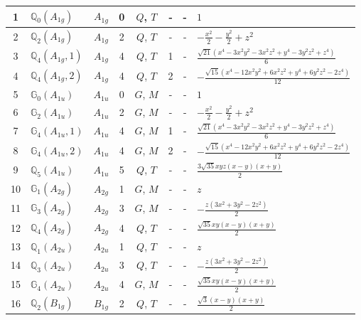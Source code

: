 \documentclass[fleqn,10pt,landscape]{jsarticle}
\begin{document}
\begin{longtable}[l]{clcccccl}
1 & $\mathbb{Q}_{0}(A_{1g})$ & $A_{1g}$ & 0 & $Q$, $T$ & - & - & $1$ \\ \hline
2 & $\mathbb{Q}_{2}(A_{1g})$ & $A_{1g}$ & 2 & $Q$, $T$ & - & - & $- \frac{x^{2}}{2} - \frac{y^{2}}{2} + z^{2}$ \\ \hline
3 & $\mathbb{Q}_{4}(A_{1g},1)$ & $A_{1g}$ & 4 & $Q$, $T$ & 1 & - & $\frac{\sqrt{21} \left(x^{4} - 3 x^{2} y^{2} - 3 x^{2} z^{2} + y^{4} - 3 y^{2} z^{2} + z^{4}\right)}{6}$ \\ \hline
4 & $\mathbb{Q}_{4}(A_{1g},2)$ & $A_{1g}$ & 4 & $Q$, $T$ & 2 & - & $- \frac{\sqrt{15} \left(x^{4} - 12 x^{2} y^{2} + 6 x^{2} z^{2} + y^{4} + 6 y^{2} z^{2} - 2 z^{4}\right)}{12}$ \\ \hline
5 & $\mathbb{G}_{0}(A_{1u})$ & $A_{1u}$ & 0 & $G$, $M$ & - & - & $1$ \\ \hline
6 & $\mathbb{G}_{2}(A_{1u})$ & $A_{1u}$ & 2 & $G$, $M$ & - & - & $- \frac{x^{2}}{2} - \frac{y^{2}}{2} + z^{2}$ \\ \hline
7 & $\mathbb{G}_{4}(A_{1u},1)$ & $A_{1u}$ & 4 & $G$, $M$ & 1 & - & $\frac{\sqrt{21} \left(x^{4} - 3 x^{2} y^{2} - 3 x^{2} z^{2} + y^{4} - 3 y^{2} z^{2} + z^{4}\right)}{6}$ \\ \hline
8 & $\mathbb{G}_{4}(A_{1u},2)$ & $A_{1u}$ & 4 & $G$, $M$ & 2 & - & $- \frac{\sqrt{15} \left(x^{4} - 12 x^{2} y^{2} + 6 x^{2} z^{2} + y^{4} + 6 y^{2} z^{2} - 2 z^{4}\right)}{12}$ \\ \hline
9 & $\mathbb{Q}_{5}(A_{1u})$ & $A_{1u}$ & 5 & $Q$, $T$ & - & - & $\frac{3 \sqrt{35} x y z \left(x - y\right) \left(x + y\right)}{2}$ \\ \hline
10 & $\mathbb{G}_{1}(A_{2g})$ & $A_{2g}$ & 1 & $G$, $M$ & - & - & $z$ \\ \hline
11 & $\mathbb{G}_{3}(A_{2g})$ & $A_{2g}$ & 3 & $G$, $M$ & - & - & $- \frac{z \left(3 x^{2} + 3 y^{2} - 2 z^{2}\right)}{2}$ \\ \hline
12 & $\mathbb{Q}_{4}(A_{2g})$ & $A_{2g}$ & 4 & $Q$, $T$ & - & - & $\frac{\sqrt{35} x y \left(x - y\right) \left(x + y\right)}{2}$ \\ \hline
13 & $\mathbb{Q}_{1}(A_{2u})$ & $A_{2u}$ & 1 & $Q$, $T$ & - & - & $z$ \\ \hline
14 & $\mathbb{Q}_{3}(A_{2u})$ & $A_{2u}$ & 3 & $Q$, $T$ & - & - & $- \frac{z \left(3 x^{2} + 3 y^{2} - 2 z^{2}\right)}{2}$ \\ \hline
15 & $\mathbb{G}_{4}(A_{2u})$ & $A_{2u}$ & 4 & $G$, $M$ & - & - & $\frac{\sqrt{35} x y \left(x - y\right) \left(x + y\right)}{2}$ \\ \hline
16 & $\mathbb{Q}_{2}(B_{1g})$ & $B_{1g}$ & 2 & $Q$, $T$ & - & - & $\frac{\sqrt{3} \left(x - y\right) \left(x + y\right)}{2}$ \\ \hline

\end{longtable}
\end{document}
